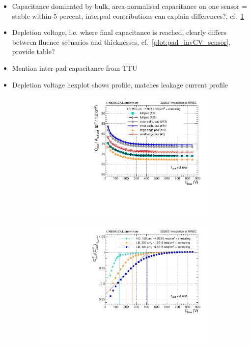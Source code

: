 \begin{itemize}
	\item Capacitance dominated by bulk, area-normalised capacitance on one sensor = stable within 5 percent, interpad contributions can explain differences?, cf.~\ref{plot:pad_CV_channels}
	\item Depletion voltage, i.e. where final capacitance is reached, clearly differs between fluence scenarios and thicknesses, cf.~\ref{plot:pad_invCV_sensor}, provide table?
	\item Mention inter-pad capacitance from TTU
	\item Depletion voltage hexplot shows profile, matches leakage current profile
\end{itemize}


\begin{figure}
	\captionsetup[subfigure]{aboveskip=-1pt,belowskip=-1pt}
	\centering
	\begin{subfigure}[b]{0.49\textwidth}
		\includegraphics[width=0.999\textwidth]{plots/channel_cv/channel_CV_sensors_channels.pdf}
		\subcaption{
		}
		\label{plot:pad_CV_channels}
	\end{subfigure}
	\hfill
	\begin{subfigure}[b]{0.49\textwidth}
		\includegraphics[width=0.999\textwidth]{plots/channel_cv/channel_invCV_sensors_sensors.pdf}

\end{subfigure}
\end{figure}
